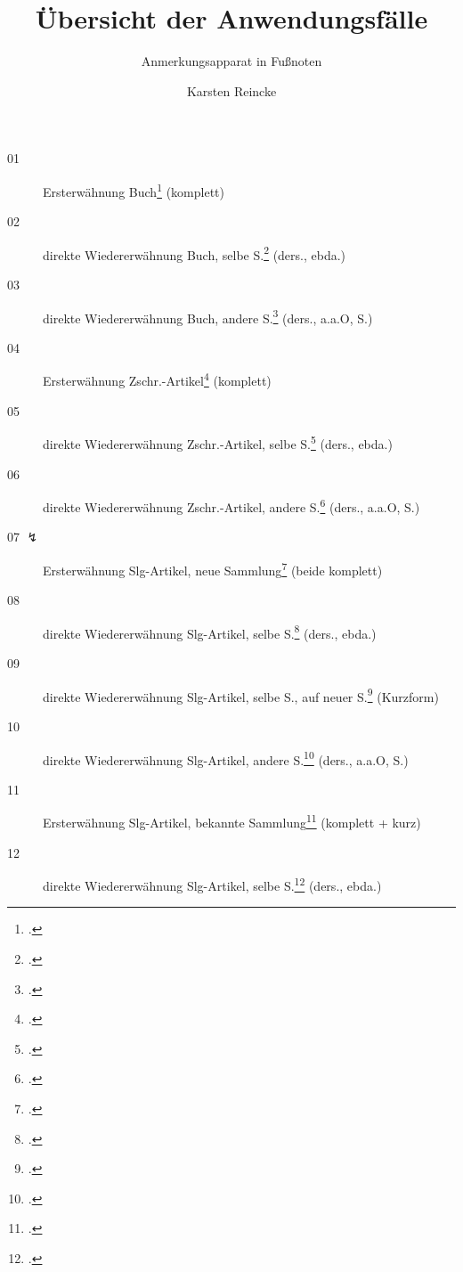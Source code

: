 \documentclass[
  DIV=calc,
  BCOR=5mm,
  11pt,
  headings=small,
  oneside,
  abstract=true,
  toc=bib,
  english,ngerman]{scrartcl}
\begin{document}
\nocite{*}

\titlehead{mycsrf.verify-: Deutsch}
\subject{(Geistes-) Wissenschaftliche Texte mit modifiziertem \textit{jurabib}}
\title{Übersicht der Anwendungsfälle}
\subtitle{Anmerkungsapparat in Fußnoten}
\author{Karsten Reincke}

\maketitle


\begin{description}

  \item[01 \checkmark] Ersterwähnung
    Buch\footcite[vgl.][12]{KantKdU1974} (komplett) 
  \item[02 \checkmark] direkte Wiedererwähnung
    Buch, selbe S.\footcite[vgl.][12]{KantKdU1974} (ders., ebda.)
  \item[03 \checkmark] direkte Wiedererwähnung
    Buch, andere S.\footcite[vgl.][13]{KantKdU1974} (ders., a.a.O, S.)
  \item[04 \checkmark] Ersterwähnung
    Zschr.-Artikel\footcite[vgl.][12]{McCarthy1980a} (komplett)
  \item[05 \checkmark] direkte Wiedererwähnung
    Zschr.-Artikel,
      selbe S.\footcite[vgl.][12]{McCarthy1980a} (ders., ebda.)
  \item[06 \checkmark] direkte Wiedererwähnung
    Zschr.-Artikel, 
      andere S.\footcite[vgl.][13]{McCarthy1980a} (ders., a.a.O, S.)
  
  \item[07 $\lightning$] Ersterwähnung 
    Slg-Artikel,
      neue Sammlung\footcite[vgl.][12]{Hays1985a} (beide komplett)
  \item[08 \checkmark] direkte Wiedererwähnung
    Slg-Artikel,
      selbe S.\footcite[vgl.][12]{Hays1985a} (ders., ebda.)
      
 \item[09 \checkmark] direkte Wiedererwähnung
    Slg-Artikel,
      selbe S.,
       auf neuer S.\footcite[vgl.][12]{Hays1985a} (Kurzform)
  \item[10 \checkmark] direkte Wiedererwähnung
    Slg-Artikel,
      andere S.\footcite[vgl.][13]{Hays1985a} (ders., a.a.O, S.)
     
  
  \item[11 \checkmark] Ersterwähnung
    Slg-Artikel,
      bekannte Sammlung\footcite[vgl.][12]{DaBu1985a} (komplett + kurz)
  \item[12 \checkmark] direkte Wiedererwähnung
    Slg-Artikel, selbe S.\footcite[vgl.][12]{DaBu1985a} (ders., ebda.)


\end{description}
\end{document}
